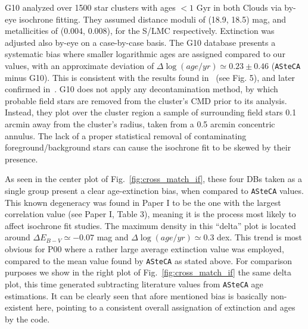 \documentclass{aa}
\begin{document}
G10 analyzed over 1500 star clusters with ages ${<}1$ Gyr in both Clouds via
by-eye isochrone fitting. They assumed distance moduli of (18.9, 18.5) mag, and
metallicities of (0.004, 0.008), for the S/LMC respectively. Extinction was
adjusted also by-eye on a case-by-case basis.
The G10 database presents a systematic bias where smaller logarithmic ages are
assigned compared to our values, with an approximate deviation of $\Delta
\log(age/yr){\simeq}0.23\pm0.46$ (\texttt{ASteCA} minus G10). This is consistent
with the results found in~\cite{Choudhury_2015} (see Fig. 5), and later
confirmed in~\cite{Piatti_2015a,Piatti_2015b}.
%
G10 does not apply any decontamination method, by which probable field stars are
removed from the cluster's CMD prior to its analysis. Instead, they plot over
the cluster region a sample of surrounding field stars 0.1 arcmin away from the
cluster's radius, taken from a 0.5 arcmin concentric annulus. The lack of a
proper statistical removal of contaminating foreground/background stars can
cause the isochrone fit to be skewed by their presence.

%
As seen in the center plot of Fig.~\ref{fig:cross_match_if}, these four DBs
taken as a single group present a clear age-extinction bias, when compared
to \texttt{ASteCA} values. This known degeneracy was found in Paper I to be
the one with the largest correlation value (see Paper I, Table 3), meaning it is
the process most likely to affect isochrone fit studies.
The maximum density in this ``delta'' plot is located around
$\Delta E_{B-V}{\simeq-}0.07$ mag and $\Delta \log(age/yr){\simeq}0.3$ dex.
This trend is most obvious for P00 where a rather large average extinction
value was employed, compared to the mean value found by \texttt{ASteCA} as
stated above.
%
For comparison purposes we show in the right plot of
Fig.~\ref{fig:cross_match_if} the same delta plot, this time generated
subtracting literature values from \texttt{ASteCA} age estimations. It can 
be clearly seen that afore mentioned bias is basically non-existent here,
pointing to a consistent overall assignation of extinction and ages by
the code.
\end{document}
